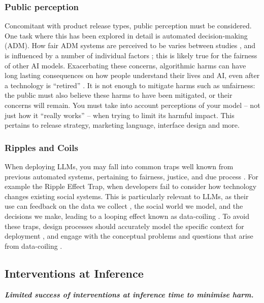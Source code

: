 \subsubsection{Public perception}
Concomitant with product release types, public perception must be considered. One task where this has been explored in detail is automated decision-making (ADM).
How fair ADM systems are perceived to be varies between studies \cite{lee_understanding_2018, araujo_ai_2020}, and is influenced by a number of individual factors \citep{wang_factors_2020}; this is likely true for the fairness of other AI models. Exacerbating these concerns, algorithmic harms can have long lasting consequences on how people understand their lives and AI, even after a technology is ``retired'' \citep{ehsan_algorithmic_2022}. It is not enough to mitigate harms such as unfairness: the public must also believe these harms to have been mitigated, or their concerns will remain. You must take into account perceptions of your model -- not just how it ``really works'' -- when trying to limit its harmful impact.  This pertains to release strategy, marketing language, interface design and more.

\subsubsection{Ripples and Coils}
When deploying LLMs, you may fall into common traps well known from previous automated systems, pertaining to fairness, justice, and due process \cite{selbst_fairness_2019}. For example the Ripple Effect Trap, when developers fail to consider how technology changes existing social systems. This is particularly relevant to LLMs, as their use can feedback on the data we collect \citep{pan_risk_2023}, the social world we model, and the decisions we make, leading to a looping effect known as data-coiling \cite{beer_problem_2022}.
To avoid these traps, design processes should accurately model the specific context for deployment \cite{selbst_fairness_2019}, and engage with the conceptual problems and questions that arise from data-coiling \cite{beer_problem_2022}.

\subsection{Interventions at Inference}\label{subsec:inf}
\noindent\textbf{\textit{Limited success of interventions at inference time to minimise harm.}}
\newline 

